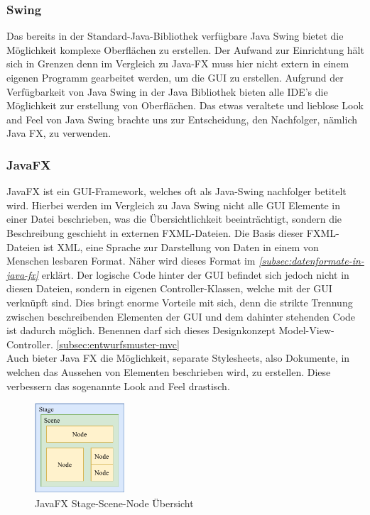 \subsubsection{Swing}
Das bereits in der Standard-Java-Bibliothek verfügbare Java Swing bietet die Möglichkeit komplexe Oberflächen zu erstellen.
Der Aufwand zur Einrichtung hält sich in Grenzen denn im Vergleich zu Java-FX muss hier nicht extern in einem eigenen Programm gearbeitet werden, um die GUI zu erstellen.
Aufgrund der Verfügbarkeit von Java Swing in der Java Bibliothek bieten alle IDE's die Möglichkeit zur erstellung von Oberflächen.
Das etwas veraltete und lieblose Look and Feel von Java Swing brachte uns zur Entscheidung, den Nachfolger, nämlich Java FX, zu verwenden.
\subsubsection{JavaFX}\label{sssec: JavaFX}
JavaFX ist ein GUI-Framework, welches oft als Java-Swing nachfolger betitelt wird.
Hierbei werden im Vergleich zu Java Swing nicht alle GUI Elemente in einer Datei beschrieben, was die Übersichtlichkeit beeinträchtigt, sondern die Beschreibung geschieht in externen FXML-Dateien.
Die Basis dieser FXML-Dateien ist XML, eine Sprache zur Darstellung von Daten in einem von Menschen lesbaren Format.
Näher wird dieses Format im \textit{\autoref{subsec:datenformate-in-java-fx}} erklärt.
Der logische Code hinter der GUI befindet sich jedoch nicht in diesen Dateien, sondern in eigenen Controller-Klassen, welche mit der GUI verknüpft sind.
Dies bringt enorme Vorteile mit sich, denn die strikte Trennung zwischen beschreibenden Elementen der GUI
und dem dahinter stehenden Code ist dadurch möglich.
Benennen darf sich dieses Designkonzept Model-View-Controller. \autoref{subsec:entwurfsmuster-mvc}\\
Auch bieter Java FX die Möglichkeit, separate Stylesheets, also Dokumente, in welchen das Aussehen von Elementen beschrieben wird, zu erstellen.
Diese verbessern das sogenannte Look and Feel drastisch.

\begin{figure}[H]
    \centering
    \includegraphics[width=0.3\textwidth]{fig/ainf/JavaFXStageSceneNode.pdf}
    \caption{JavaFX Stage-Scene-Node Übersicht}
    \label{fig:Tool SceneBuilder}
\end{figure}
